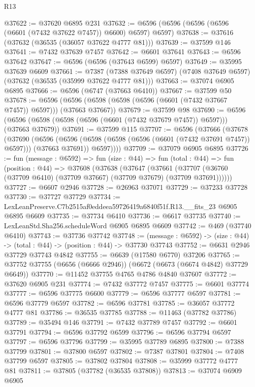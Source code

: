 \begin{lexlean}{R13}
\begin{coremodule}
@37622 := @37620 @6895 @231
@37632 := @6596 (@6596 (@6596 (@6596 (@6601 (@7432 @37622 @7457)) @6600) @6597) @6597)
@37638 := @37616 (@37632 (@36535 (@36057 @37622 @4777 @81)))
@37639 := @37599 @146
@37641 := @7432 @37639 @7457
@37642 := @6601 @37641
@37643 := @6596 @37642
@37647 := @6596 (@6596 (@37643 @6599) @6597)
@37649 := @35995 @37639 @6609
@37661 := @7387
    (@7388 @37649 @6597)
    (@7408 @37649 @6597)
    (@37632 (@36535 (@35999 @37622 @4777 @81)))
@37663 := @37074 @6905 @6895
@37666 := @6596 (@6747 (@37663 @6410))
@37667 := @37599 @50
@37678 := @6596 (@6596 (@6598 (@6598 (@6596 (@6601 (@7432 @37667 @7457)) @6597))) (@37663 @37667))
@37679 := @37599 @98
@37690 := @6596 (@6596 (@6598 (@6598 (@6596 (@6601 (@7432 @37679 @7457)) @6597))) (@37663 @37679))
@37691 := @37599 @115
@37707 := @6596
    (@37666
      (@37678
        (@37690
          (@6596
            (@6596 (@6598 (@6598 (@6596 (@6601 (@7432 @37691 @7457)) @6597))) (@37663 @37691))
            @6597))))
@37709 := @37079 @6905 @6895
@37726 := fun (message : @6592) =>
  fun (size : @44) =>
  fun (total : @44) =>
  fun (position : @44) =>
  @37608
    (@37638
      (@37647
        (@37661 (@37707 (@36760 (@37709 @6410) (@37709 @37667) (@37709 @37679) (@37709 @37691))))))
@37727 := @6607 @2946
@37728 := @26963 @37071
@37729 := @37233 @37728
@37730 := @37727 @37729
@37734 := LexLeanPreserve.C7b2515af0eddeea59726419a6840f51f.R13.__fits_23 @6905 @6895 @6609
@37735 := @37734 @6410
@37736 := @6617 @37735
@37740 := LexLeanStd.Sha256.scheduleWord @6905 @6895 @6609
@37742 := @469 (@37740 @6410)
@37743 := @37736 @37742
@37748 := (message : @6592) -> (size : @44) -> (total : @44) -> (position : @44) -> @37730 @37743
@37752 := @6631 @2946 @37729 @37743 @4842
@37755 := @6639 (@17580 @6770) @37206
@37765 := @37752 @37755 (@6656 (@6666 @2946)) (@6672 (@6673 (@6674 @4842) @37729 @6649))
@37770 := @11452 @37755 @4765 @4786 @4840 @37607
@37772 := @37620 @6905 @231
@37774 := @7432 @37772 @7457
@37775 := @6601 @37774
@37777 := @6596 @37775 @6600
@37779 := @6596 @37777 @6597
@37781 := @6596 @37779 @6597
@37782 := @6596 @37781
@37785 := @36057 @37772 @4777 @81
@37786 := @36535 @37785
@37788 := @11463 (@37782 @37786)
@37789 := @35494 @146
@37791 := @7432 @37789 @7457
@37792 := @6601 @37791
@37794 := @6596 @37792 @6599
@37796 := @6596 @37794 @6597
@37797 := @6596 @37796
@37799 := @35995 @37789 @6895
@37800 := @7388 @37799
@37801 := @37800 @6597
@37802 := @7387 @37801
@37804 := @7408 @37799 @6597
@37805 := @37802 @37804
@37808 := @35999 @37772 @4777 @81
@37811 := @37805 (@37782 (@36535 @37808))
@37813 := @37074 @6909 @6905

\end{coremodule}
\end{lexlean}
